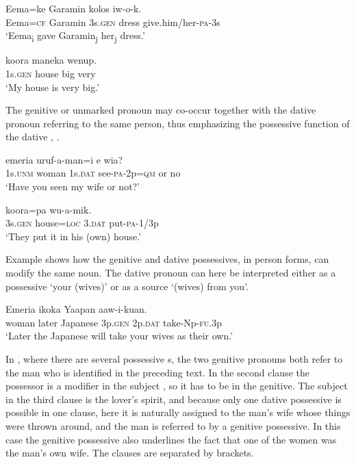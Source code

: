 \ea%
\label{ex:3:x590}
\gll Eema=ke Garamin  kolos iw-o-k. \\
Eema=\textsc{cf} Garamin 3s.\textsc{gen} dress give.him/her-\textsc{pa}-3s\\
\glt`Eema\textsubscript{i} gave Garamin\textsubscript{j} her\textsubscript{j} dress.'
\z

\ea%
\label{ex:3:x591}
\gll {} koora maneka wenup. \\
1s.\textsc{gen} house big very\\
\glt`My house is very big.'
\z

The genitive or unmarked pronoun may co-occur together with the dative pronoun referring to the same person, thus emphasizing the possessive function of the dative , .

\ea%
\label{ex:3:x1863}
\gll {} emeria  uruf-a-man=i e wia? \\
1s.\textsc{unm} woman 1s.\textsc{dat} see-\textsc{pa}-2p=\textsc{qm} or no\\
\glt`Have you seen my wife or not?'
\z

\ea%
\label{ex:3:x593}
\gll {} koora=pa  wu-a-mik. \\
3s.\textsc{gen} house=\textsc{loc} 3.\textsc{dat} put-\textsc{pa}-1/3p\\
\glt`They put it in his (own) house.'
\z

Example  shows how the genitive and dative possessives, in  person forms, can modify the same noun. The dative pronoun can here be interpreted either as a possessive `your (wives)' or as a source `(wives) from you'.

\ea%
\label{ex:3:x594}
\gll Emeria ikoka Yaapan   aaw-i-kuan. \\
woman later Japanese 3p.\textsc{gen} 2p.\textsc{dat} take-Np-\textsc{fu}.3p\\
\glt`Later the Japanese will take your wives as their own.'
\z

In , where there are several possessive s, the two genitive pronouns both refer to the man who is identified in the preceding text. In the second clause the possessor is a modifier in the subject , so it has to be in the genitive. The subject in the third clause is the lover's spirit, and because only one dative possessive is possible in one clause, here it is naturally assigned to the man's wife whose things were thrown around, and the man is referred to by a genitive possessive. In this case the genitive possessive also underlines the fact that one of the women was the man's own wife. The clauses are separated by brackets.

